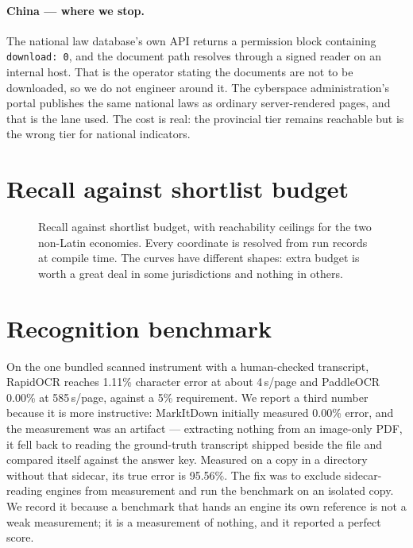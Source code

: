 \documentclass{article}
\begin{document}
\paragraph{China --- where we stop.} The national law database's own API returns
a permission block containing \texttt{download:\,0}, and the document path
resolves through a signed reader on an internal host. That is the operator
stating the documents are not to be downloaded, so we do not engineer around it.
The cyberspace administration's portal publishes the same national laws as
ordinary server-rendered pages, and that is the lane used. The cost is real: the
provincial tier remains reachable but is the wrong tier for national indicators.

\section{Recall against shortlist budget}
\label{app:curve}

\begin{figure}[t]
\centering

\caption{Recall against shortlist budget, with reachability ceilings for the two
non-Latin economies. Every coordinate is resolved from run records at compile
time. The curves have different shapes: extra budget is worth a great deal in
some jurisdictions and nothing in others.}
\label{fig:curve}
\end{figure}

\section{Recognition benchmark}
\label{app:ocr}

On the one bundled scanned instrument with a human-checked transcript, RapidOCR
reaches 1.11\% character error at about 4\,s/page and PaddleOCR 0.00\% at
585\,s/page, against a 5\% requirement. We report a third number because it is
more instructive: MarkItDown initially measured 0.00\% error, and the measurement
was an artifact --- extracting nothing from an image-only PDF, it fell back to
reading the ground-truth transcript shipped beside the file and compared itself
against the answer key. Measured on a copy in a directory without that sidecar,
its true error is 95.56\%. The fix was to exclude sidecar-reading engines from
measurement and run the benchmark on an isolated copy. We record it because a
benchmark that hands an engine its own reference is not a weak measurement; it is
a measurement of nothing, and it reported a perfect score.
\end{document}
